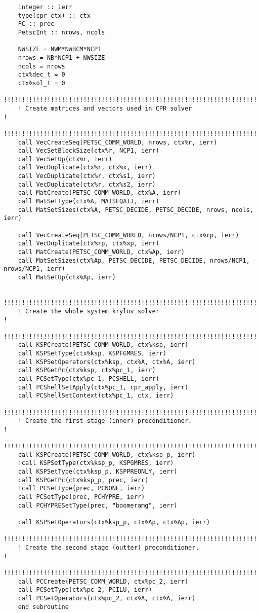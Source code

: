 \begin{lstlisting}
    integer :: ierr
    type(cpr_ctx) :: ctx
    PC :: prec
    PetscInt :: nrows, ncols

    NWSIZE = NWM*NWBCM*NCP1
    nrows = NB*NCP1 + NWSIZE
    ncols = nrows
    ctx%dec_t = 0
    ctx%sol_t = 0
    !!!!!!!!!!!!!!!!!!!!!!!!!!!!!!!!!!!!!!!!!!!!!!!!!!!!!!!!!!!!!!!!!!!!!!!
    ! Create matrices and vectors used in CPR solver                      !
    !!!!!!!!!!!!!!!!!!!!!!!!!!!!!!!!!!!!!!!!!!!!!!!!!!!!!!!!!!!!!!!!!!!!!!!
    call VecCreateSeq(PETSC_COMM_WORLD, nrows, ctx%r, ierr)
    call VecSetBlockSize(ctx%r, NCP1, ierr)
    call VecSetUp(ctx%r, ierr)
    call VecDuplicate(ctx%r, ctx%x, ierr)
    call VecDuplicate(ctx%r, ctx%s1, ierr)
    call VecDuplicate(ctx%r, ctx%s2, ierr)
    call MatCreate(PETSC_COMM_WORLD, ctx%A, ierr)
    call MatSetType(ctx%A, MATSEQAIJ, ierr)
    call MatSetSizes(ctx%A, PETSC_DECIDE, PETSC_DECIDE, nrows, ncols, ierr)

    call VecCreateSeq(PETSC_COMM_WORLD, nrows/NCP1, ctx%rp, ierr)
    call VecDuplicate(ctx%rp, ctx%xp, ierr)
    call MatCreate(PETSC_COMM_WORLD, ctx%Ap, ierr)
    call MatSetSizes(ctx%Ap, PETSC_DECIDE, PETSC_DECIDE, nrows/NCP1, nrows/NCP1, ierr)
    call MatSetUp(ctx%Ap, ierr)

    !!!!!!!!!!!!!!!!!!!!!!!!!!!!!!!!!!!!!!!!!!!!!!!!!!!!!!!!!!!!!!!!!!!!!!!
    ! Create the whole system krylov solver                               !
    !!!!!!!!!!!!!!!!!!!!!!!!!!!!!!!!!!!!!!!!!!!!!!!!!!!!!!!!!!!!!!!!!!!!!!!
    call KSPCreate(PETSC_COMM_WORLD, ctx%ksp, ierr)
    call KSPSetType(ctx%ksp, KSPFGMRES, ierr)
    call KSPSetOperators(ctx%ksp, ctx%A, ctx%A, ierr)
    call KSPGetPc(ctx%ksp, ctx%pc_1, ierr)
    call PCSetType(ctx%pc_1, PCSHELL, ierr)
    call PCShellSetApply(ctx%pc_1, cpr_apply, ierr)
    call PCShellSetContext(ctx%pc_1, ctx, ierr)
    !!!!!!!!!!!!!!!!!!!!!!!!!!!!!!!!!!!!!!!!!!!!!!!!!!!!!!!!!!!!!!!!!!!!!!!
    ! Create the first stage (inner) preconditioner.                      !
    !!!!!!!!!!!!!!!!!!!!!!!!!!!!!!!!!!!!!!!!!!!!!!!!!!!!!!!!!!!!!!!!!!!!!!!
    call KSPCreate(PETSC_COMM_WORLD, ctx%ksp_p, ierr)
    !call KSPSetType(ctx%ksp_p, KSPGMRES, ierr)
    call KSPSetType(ctx%ksp_p, KSPPREONLY, ierr)
    call KSPGetPc(ctx%ksp_p, prec, ierr)
    !call PCSetType(prec, PCNONE, ierr)
    call PCSetType(prec, PCHYPRE, ierr)
    call PCHYPRESetType(prec, "boomeramg", ierr)

    call KSPSetOperators(ctx%ksp_p, ctx%Ap, ctx%Ap, ierr)
    !!!!!!!!!!!!!!!!!!!!!!!!!!!!!!!!!!!!!!!!!!!!!!!!!!!!!!!!!!!!!!!!!!!!!!!
    ! Create the second stage (outter) preconditioner.                    !
    !!!!!!!!!!!!!!!!!!!!!!!!!!!!!!!!!!!!!!!!!!!!!!!!!!!!!!!!!!!!!!!!!!!!!!!
    call PCCreate(PETSC_COMM_WORLD, ctx%pc_2, ierr)
    call PCSetType(ctx%pc_2, PCILU, ierr)
    call PCSetOperators(ctx%pc_2, ctx%A, ctx%A, ierr)
    end subroutine


\end{lstlisting}
